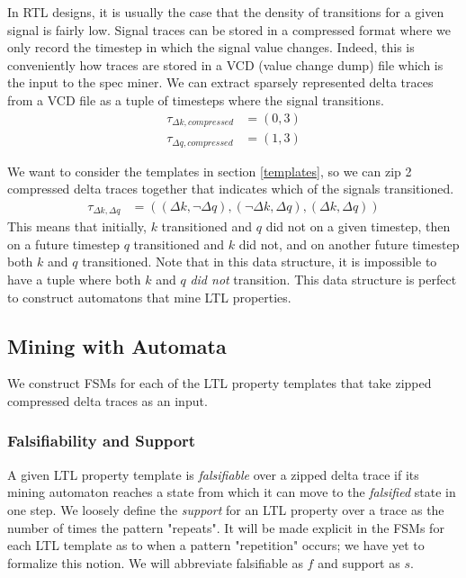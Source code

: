 \documentclass[acmlarge,11pt]{acmart}
\begin{document}
In RTL designs, it is usually the case that the density of transitions for a given signal is fairly low.
Signal traces can be stored in a compressed format where we only record the timestep in which the signal value changes.
Indeed, this is conveniently how traces are stored in a VCD (value change dump) file which is the input to the spec miner.
We can extract sparsely represented delta traces from a VCD file as a tuple of timesteps where the signal transitions. %
\begin{align*}
  \tau_{\Delta k, compressed} &= (0, 3) \\
  \tau_{\Delta q, compressed} &= (1, 3)
\end{align*}

We want to consider the templates in section \ref{templates}, so we can zip 2 compressed delta traces together that indicates which of the signals transitioned.
\begin{align*}
  \tau_{\Delta k, \Delta q} &= ((\Delta k, \lnot \Delta q), (\lnot \Delta k, \Delta q), (\Delta k, \Delta q))
\end{align*}
This means that initially, $k$ transitioned and $q$ did not on a given timestep, then on a future timestep $q$ transitioned and $k$ did not, and on another future timestep both $k$ and $q$ transitioned.
Note that in this data structure, it is impossible to have a tuple where both $k$ and $q$ \textit{did not} transition.
This data structure is perfect to construct automatons that mine LTL properties.


\subsection{Mining with Automata}
We construct FSMs for each of the LTL property templates that take zipped compressed delta traces as an input.

\subsubsection{Falsifiability and Support}
A given LTL property template is \textit{falsifiable} over a zipped delta trace if its mining automaton reaches a state from which it can move to the \textit{falsified} state in one step.
We loosely define the \textit{support} for an LTL property over a trace as the number of times the pattern "repeats".
It will be made explicit in the FSMs for each LTL template as to when a pattern "repetition" occurs; we have yet to formalize this notion.
We will abbreviate falsifiable as $f$ and support as $s$.
\end{document}
